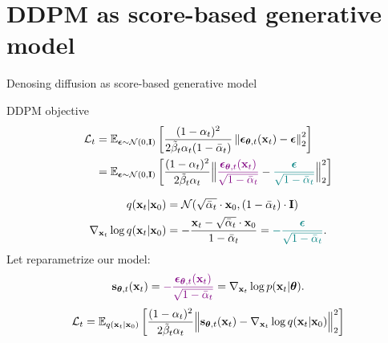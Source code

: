 \section{DDPM as score-based generative model}
\begin{frame}{Denosing diffusion as score-based generative model}
	\begin{block}{DDPM objective}
		\vspace{-0.7cm}
		\begin{align*}
			\mathcal{L}_t &= \mathbb{E}_{\boldsymbol{\epsilon} \sim \mathcal{N}(0, \mathbf{I})} \left[ \frac{(1 - \alpha_t)^2}{2\tilde{\beta}_t \alpha_t  (1 - \bar{\alpha}_t)}  \left\|  \boldsymbol{\epsilon}_{\boldsymbol{\theta}, t} (\mathbf{x}_t) - \boldsymbol{\epsilon}\right\|_2^2  \right] \\
			& = \mathbb{E}_{\boldsymbol{\epsilon} \sim \mathcal{N}(0, \mathbf{I})} \left[ \frac{(1 - \alpha_t)^2}{2\tilde{\beta}_t \alpha_t }  \Bigl\| {\color{violet} \frac{\boldsymbol{\epsilon}_{\boldsymbol{\theta}, t}  (\mathbf{x}_t) }{\sqrt{1 - \bar{\alpha}_t}}} - {\color{teal}\frac{\boldsymbol{\epsilon}}{\sqrt{1 - \bar{\alpha}_t}}}\Bigr\|_2^2  \right]
		\end{align*}
		\vspace{-0.7cm}
	\end{block}
	\vspace{-0.5cm}
	\begin{align*}
		q(\mathbf{x}_t | \mathbf{x}_0) &= \mathcal{N}(\sqrt{\bar{\alpha}_t} \cdot \mathbf{x}_0, (1 - \bar{\alpha}_t) \cdot \mathbf{I}) \\
		\nabla_{\mathbf{x}_t} \log q(\mathbf{x}_t | \mathbf{x}_0) &= - \frac{\mathbf{x}_t - \sqrt{\bar{\alpha}_t} \cdot \mathbf{x}_0}{1 - \bar{\alpha}_t} = {\color{teal}-  \frac{\boldsymbol{\epsilon}}{\sqrt{1 - \bar{\alpha}_t}}}.
	\end{align*}
		Let reparametrize our model: 
		\vspace{-0.2cm}
		\[
			\mathbf{s}_{\boldsymbol{\theta}, t}(\mathbf{x}_t) = {\color{violet}- \frac{\boldsymbol{\epsilon}_{\boldsymbol{\theta}, t}(\mathbf{x}_t)}{\sqrt{1 - \bar{\alpha}_t}}} = \nabla_{\mathbf{x}_t} \log p(\mathbf{x}_t | \boldsymbol{\theta}).
		\]
		\[
			\mathcal{L}_t = \mathbb{E}_{q(\mathbf{x}_t | \mathbf{x}_0)} \left[ \frac{(1 - \alpha_t)^2}{2\tilde{\beta}_t \alpha_t}  \Bigl\|  \mathbf{s}_{\boldsymbol{\theta}, t} (\mathbf{x}_t) - \nabla_{\mathbf{x}_t} \log q(\mathbf{x}_t | \mathbf{x}_0) \Bigr\|_2^2  \right]
		\]
	\end{frame}
